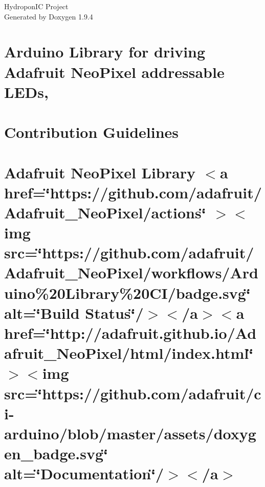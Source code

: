 \documentclass[twoside]{book}
\newcommand{\+}{\discretionary{\mbox{\scriptsize$\hookleftarrow$}}{}{}}
\newcommand{\clearemptydoublepage}{%
    \newpage{\pagestyle{empty}\cleardoublepage}%
  }
\begin{document}
  \raggedbottom
    \hypersetup{pageanchor=false,
                bookmarksnumbered=true,
                pdfencoding=unicode
               }
  \begin{titlepage}
  \vspace*{7cm}
  \begin{center}%
  {\Large Hydropon\+IC Project}\\
  \vspace*{1cm}
  {\large Generated by Doxygen 1.9.4}\\
  \end{center}
  \end{titlepage}
  \clearemptydoublepage
  \tableofcontents
  \clearemptydoublepage
  \hypersetup{pageanchor=true}
\chapter{Arduino Library for driving Adafruit Neo\+Pixel addressable LEDs,}
\label{index}\hypertarget{index}{}
\chapter{Contribution Guidelines}
\label{md_lib__adafruit__neo_pixel__c_o_n_t_r_i_b_u_t_i_n_g}

\chapter{Adafruit Neo\+Pixel Library \texorpdfstring{$<$}{<}a href=\char`\"{}https\+://github.\+com/adafruit/\+Adafruit\+\_\+\+Neo\+Pixel/actions\char`\"{} \texorpdfstring{$>$}{>}\texorpdfstring{$<$}{<}img src=\char`\"{}https\+://github.\+com/adafruit/\+Adafruit\+\_\+\+Neo\+Pixel/workflows/\+Arduino\%20\+Library\%20\+CI/badge.\+svg\char`\"{} alt=\char`\"{}\+Build Status\char`\"{}/\texorpdfstring{$>$}{>}\texorpdfstring{$<$}{<}/a\texorpdfstring{$>$}{>}\texorpdfstring{$<$}{<}a href=\char`\"{}http\+://adafruit.\+github.\+io/\+Adafruit\+\_\+\+Neo\+Pixel/html/index.\+html\char`\"{} \texorpdfstring{$>$}{>}\texorpdfstring{$<$}{<}img src=\char`\"{}https\+://github.\+com/adafruit/ci-\/arduino/blob/master/assets/doxygen\+\_\+badge.\+svg\char`\"{} alt=\char`\"{}\+Documentation\char`\"{}/\texorpdfstring{$>$}{>}\texorpdfstring{$<$}{<}/a\texorpdfstring{$>$}{>}}
\label{md_lib__adafruit__neo_pixel__r_e_a_d_m_e}

\end{document}
